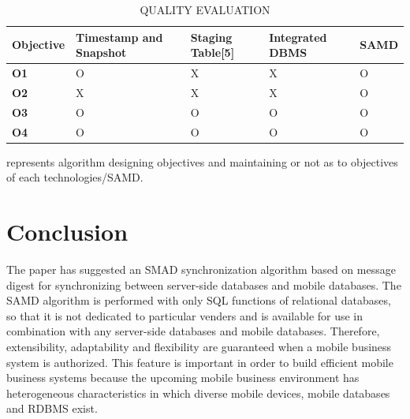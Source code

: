 \documentclass[conference]{IEEEtran}
\begin{document}
\begin{enumerate}[label=(\Alph*)]
\begin{table}[h!]
\centering
\caption{QUALITY EVALUATION }
\setlength\tabcolsep{2.5pt}
\begin{tabular}{|m{5em}| m{5em}| m{5em}| m{5em}| m{5em}|} 
 \hline
\textbf{Objective} & \textbf{Timestamp and Snapshot} & \textbf{Staging
Table[5]} & \textbf{Integrated DBMS } & \textbf{SAMD}  \\ 
 \hline\hline
 \textbf{O1}&O&X&X&O\\ 
 \textbf{O2}&X&X&X&O\\
 \textbf{O3}&O&O&O&O\\
 \textbf{O4}&O&O&O&O\\ 
 \hline 
\end{tabular}
\label{table:7}
\end{table}

represents algorithm designing objectives and maintaining or not as to objectives of each technologies/SAMD. 

\end{enumerate}


\section{Conclusion}
The paper has suggested an SMAD synchronization
algorithm based on message digest for synchronizing between
server-side databases and mobile databases. The SAMD
algorithm is performed with only SQL functions of relational
databases, so that it is not dedicated to particular venders and
is available for use in combination with any server-side
databases and mobile databases. Therefore, extensibility,
adaptability and flexibility are guaranteed when a mobile
business system is authorized. This feature is important in
order to build efficient mobile business systems because the
upcoming mobile business environment has heterogeneous
characteristics in which diverse mobile devices, mobile
databases and RDBMS exist. \nocite{choi} 
\end{document}
